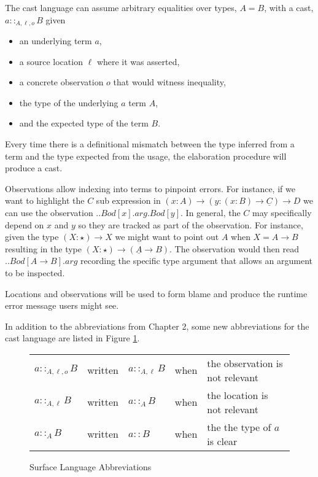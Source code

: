 The cast language can assume arbitrary equalities over types, $A=B$, with a cast, $a::_{A,\ensuremath{\ell},o}B$ given
\begin{itemize}
\item an underlying term $a$,
\item a source location $\ell$ where it was asserted, 
\item a concrete observation $o$ that would witness inequality, 
\item the type of the underlying $a$ term $A$, 
\item and the expected type of the term $B$. 
\end{itemize}
Every time there is a definitional mismatch between the type inferred from a term and the type expected from the usage, the elaboration procedure will produce a cast.

Observations allow indexing into terms to pinpoint errors.
For instance, if we want to highlight the $C$ sub expression in $\left(x:A\right)\rightarrow\left(y:\left(x:B\right)\rightarrow\underline{C}\right)\rightarrow D$ we can use the observation $..Bod[x].arg.Bod[y]$.
In general, the $C$ may specifically depend on $x$ and $y$ so they are tracked as part of the observation.
For instance, given the type $\left(X:\star\right)\rightarrow X$ we might want to point out $A$ when $X=A\rightarrow B$ resulting in the type $\left(X:\star\right)\rightarrow\left(\underline{A}\rightarrow B\right)$.
The observation would then read $..Bod[A\rightarrow B].arg$ recording the specific type argument that allows an argument to be inspected.

Locations and observations will be used to form blame and produce the runtime error message users might see.

In addition to the abbreviations from Chapter 2, some new abbreviations for the cast language are listed in Figure \ref{fig:cast-pre-syntax-abrev}.
\begin{figure}
\begin{tabular}{lclll}
$a::_{A,\ensuremath{\ell},o}B$ & written & $a::_{A,\ensuremath{\ell}}B$ & when & the observation is not relevant\tabularnewline
$a::_{A,\ensuremath{\ell}}B$ & written & $a::_{A}B$ & when & the location is not relevant\tabularnewline
$a::_{A}B$ & written & $a::B$ & when & the the type of $a$is clear\tabularnewline
\end{tabular}

\caption{Surface Language Abbreviations}
\label{fig:cast-pre-syntax-abrev}
\end{figure}


